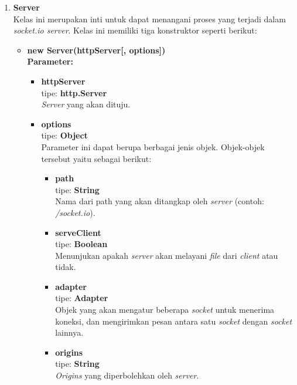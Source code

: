 \documentclass[a4paper,twoside]{article}
\begin{document}
\begin{enumerate}
\begin{enumerate}
			\begin{enumerate}
				\item \textbf{Server} \\ 
				Kelas ini merupakan inti untuk dapat menangani proses yang terjadi dalam \textit{socket.io server}. Kelas ini memiliki tiga konstruktor seperti berikut: 
				\begin{itemize}
					\item \textbf{new Server(httpServer[, options])} \\ 
					\textbf{Parameter:}
					\begin{itemize}
						\item \textbf{httpServer} \\ tipe: \textbf{http.Server} \\ \textit{Server} yang akan dituju.
						\item \textbf{options} \\ tipe: \textbf{Object} \\ Parameter ini dapat berupa berbagai jenis objek. Objek-objek tersebut yaitu sebagai berikut: 
						\begin{itemize}
							\item \textbf{path} \\ tipe: \textbf{String} \\ Nama dari path yang akan ditangkap oleh \textit{server} (contoh: \textit{/socket.io}).
							
							\item \textbf{serveClient} \\ tipe: \textbf{Boolean} \\ Menunjukan apakah \textit{server} akan melayani \textit{file} dari \textit{client} atau tidak.
							
							\item \textbf{adapter} \\ tipe: \textbf{Adapter} \\ Objek yang akan mengatur beberapa \textit{socket} untuk menerima koneksi, dan mengirimkan pesan antara satu \textit{socket} dengan \textit{socket} lainnya.
							
							\item \textbf{origins} \\ tipe: \textbf{String} \\ \textit{Origins} yang diperbolehkan oleh \textit{server}.
							
						\end{itemize}
					\end{itemize}
					

\end{itemize}
\end{enumerate}
\end{enumerate}
\end{enumerate}
\end{document}
